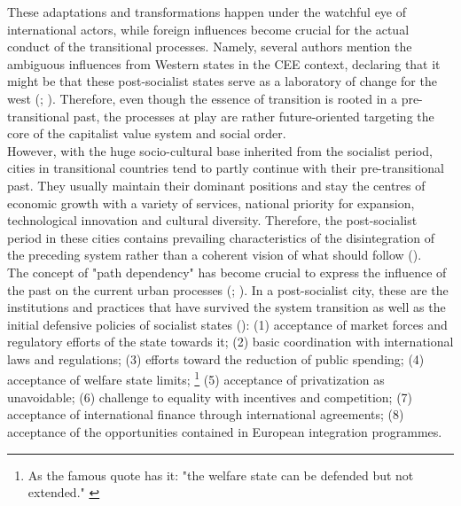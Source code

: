 \documentclass[11pt]{report}
\begin{document}
{{{{These adaptations and transformations happen under the watchful eye of international actors, while foreign influences become crucial for the actual conduct of the transitional processes.
Namely, several authors mention the ambiguous influences from Western states in the CEE context, declaring that it might be that these post-socialist states serve as  a laboratory of change for the west (\href{Maier}{\citealt{maier_czech_1998}}; \href{ref}{\citealt{vujosevic_post-socialist_2010}}).
Therefore, even though the essence of transition is rooted in a pre-transitional past, the processes at play are rather future-oriented targeting the core of the capitalist value system and social order.
\\

However, with the huge socio-cultural base inherited from the socialist period, cities in transitional countries tend to partly continue with their pre-transitional past. They usually maintain their dominant positions and stay the centres of economic growth  with  a  variety  of  services, national priority for expansion,  technological  innovation  and  cultural  diversity. 
Therefore,  the  post-socialist period in these cities contains prevailing characteristics of the disintegration of the preceding system rather than a coherent vision of what should follow (\href{Stanilov}{\citealt{stanilov_post-socialist_2007}}). 
\\

The concept of "path dependency" has become crucial to express the influence of the past on the current urban processes (\citealt{stark_system_1992}; \href{djordjevic}{\citealt{djordjevic_system_2009}}).
In a post-socialist city, these are the institutions and practices that have survived the system transition as well as the initial defensive policies of socialist states (\href{Thomas}{\citealt{thomas_thinking_1998}}): 
(1) acceptance of market  forces and regulatory efforts of the state towards it;
(2) basic coordination with international laws and regulations;
(3) efforts toward the reduction of public spending;
(4) acceptance of welfare state limits;
\footnote{As the famous quote has it: "the welfare  state can be defended  but  not  extended." \href{Thomas}{\citealt{thomas_thinking_1998}}}
(5) acceptance of  privatization  as unavoidable;
(6) challenge to equality with incentives and competition;
(7) acceptance of international finance through international agreements;
(8) acceptance of the opportunities contained in European  integration programmes.
\\

}}}}
\end{document}
